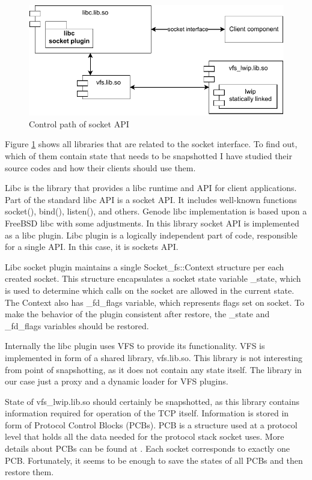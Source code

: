 \begin{figure}
    \centering
    \includegraphics[]{figs/vfs_components.drawio.pdf}
    \caption{Control path of socket API}
    \label{fig:socket_via_vfs}
\end{figure}

Figure \ref{fig:socket_via_vfs} shows all libraries that are related to the
socket interface. To find out, which of them contain state that needs to be
snapshotted I have studied their source codes and how their clients should use
them. 

Libc is the library that provides a libc runtime and API for client
applications. Part of the standard libc API is a socket API. It includes
well-known functions socket(), bind(), listen(), and others. Genode libc
implementation is based upon a FreeBSD libc with some adjustments. In this
library socket API is implemented as a libc plugin. Libc plugin is a logically
independent part of code, responsible for a single API. In this case, it is
sockets API.  

Libc socket plugin maintains a single Socket\_fs::Context structure per each
created socket. This structure encapsulates a socket state variable \_state,
which is used to determine which calls on the socket are allowed in the current
state. The Context also has \_fd\_flags variable, which represents flags set on
socket. To make the behavior of the plugin consistent after restore, the \_state
and \_fd\_flags variables should be restored.

Internally the libc plugin uses VFS to provide its functionality. VFS is
implemented in form of a shared library, vfs.lib.so. This library is not
interesting from point of snapshotting, as it does not contain any state
itself.  The library in our case just a proxy and a dynamic loader for VFS
plugins.

State of vfs\_lwip.lib.so should certainly be snapshotted, as this library
contains information required for operation of the TCP itself. Information is
stored in form of Protocol Control Blocks (PCBs). PCB is a structure used at a
protocol level that holds all the data needed for the protocol stack socket
uses. More details about PCBs can be found at \cite{stevens1996tcp}. Each
socket corresponds to exactly one PCB. Fortunately, it seems to be enough to
save the states of all PCBs and then restore them.

